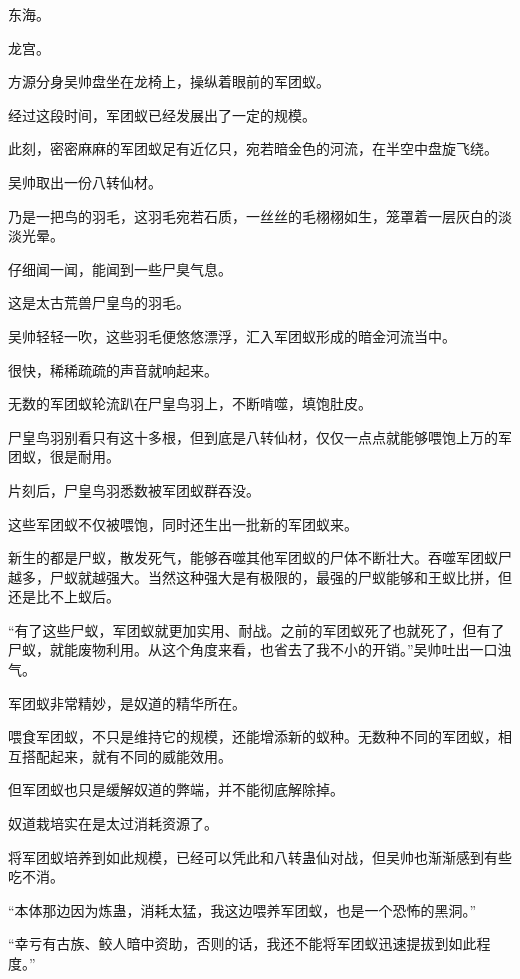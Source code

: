 
\begin{this_body}



东海。

龙宫。

方源分身吴帅盘坐在龙椅上，操纵着眼前的军团蚁。

经过这段时间，军团蚁已经发展出了一定的规模。

此刻，密密麻麻的军团蚁足有近亿只，宛若暗金色的河流，在半空中盘旋飞绕。

吴帅取出一份八转仙材。

乃是一把鸟的羽毛，这羽毛宛若石质，一丝丝的毛栩栩如生，笼罩着一层灰白的淡淡光晕。

仔细闻一闻，能闻到一些尸臭气息。

这是太古荒兽尸皇鸟的羽毛。

吴帅轻轻一吹，这些羽毛便悠悠漂浮，汇入军团蚁形成的暗金河流当中。

很快，稀稀疏疏的声音就响起来。

无数的军团蚁轮流趴在尸皇鸟羽上，不断啃噬，填饱肚皮。

尸皇鸟羽别看只有这十多根，但到底是八转仙材，仅仅一点点就能够喂饱上万的军团蚁，很是耐用。

片刻后，尸皇鸟羽悉数被军团蚁群吞没。

这些军团蚁不仅被喂饱，同时还生出一批新的军团蚁来。

新生的都是尸蚁，散发死气，能够吞噬其他军团蚁的尸体不断壮大。吞噬军团蚁尸越多，尸蚁就越强大。当然这种强大是有极限的，最强的尸蚁能够和王蚁比拼，但还是比不上蚁后。

“有了这些尸蚁，军团蚁就更加实用、耐战。之前的军团蚁死了也就死了，但有了尸蚁，就能废物利用。从这个角度来看，也省去了我不小的开销。”吴帅吐出一口浊气。

军团蚁非常精妙，是奴道的精华所在。

喂食军团蚁，不只是维持它的规模，还能增添新的蚁种。无数种不同的军团蚁，相互搭配起来，就有不同的威能效用。

但军团蚁也只是缓解奴道的弊端，并不能彻底解除掉。

奴道栽培实在是太过消耗资源了。

将军团蚁培养到如此规模，已经可以凭此和八转蛊仙对战，但吴帅也渐渐感到有些吃不消。

“本体那边因为炼蛊，消耗太猛，我这边喂养军团蚁，也是一个恐怖的黑洞。”

“幸亏有古族、鲛人暗中资助，否则的话，我还不能将军团蚁迅速提拔到如此程度。”


\end{this_body}
